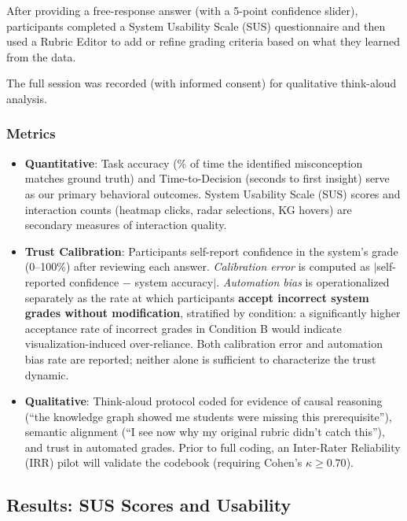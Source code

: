 \documentclass[journal,review]{vgtc}
\begin{document}
After providing a free-response answer (with a 5-point confidence slider), participants completed a System Usability Scale (SUS) questionnaire and then used a Rubric Editor to add or refine grading criteria based on what they learned from the data.

The full session was recorded (with informed consent) for qualitative think-aloud analysis.

\subsubsection{Metrics}

\begin{itemize}
  \item \textbf{Quantitative}: Task accuracy (\% of time the identified misconception matches ground truth) and Time-to-Decision (seconds to first insight) serve as our primary behavioral outcomes. System Usability Scale (SUS) scores and interaction counts (heatmap clicks, radar selections, KG hovers) are secondary measures of interaction quality.
  \item \textbf{Trust Calibration}: Participants self-report confidence in the system's grade (0--100\%) after reviewing each answer. \textit{Calibration error} is computed as $|$self-reported confidence $-$ system accuracy$|$. \textit{Automation bias} is operationalized separately as the rate at which participants \textbf{accept incorrect system grades without modification}, stratified by condition: a significantly higher acceptance rate of incorrect grades in Condition B would indicate visualization-induced over-reliance. Both calibration error and automation bias rate are reported; neither alone is sufficient to characterize the trust dynamic.
  \item \textbf{Qualitative}: Think-aloud protocol coded for evidence of causal reasoning (``the knowledge graph showed me students were missing this prerequisite''), semantic alignment (``I see now why my original rubric didn't catch this''), and trust in automated grades. Prior to full coding, an Inter-Rater Reliability (IRR) pilot will validate the codebook (requiring Cohen's $\kappa \geq 0.70$).
\end{itemize}

\subsection{Results: SUS Scores and Usability}

\end{document}
